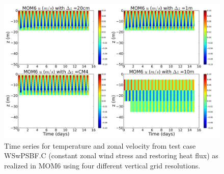\begin{figure}[h!t]
\begin{center}
\includegraphics[angle=0,width=14cm]{./figs/MOM6/WSwPSBF_C_MOM6_zonal_velocity.png}
\caption[Zonal velocity from MOM6 for WSwPSBF.C ]{\sf Time series for
  temperature and zonal velocity from test case WSwPSBF.C (constant
  zonal wind stress and restoring heat flux) as realized in MOM6 using
  four different vertical grid resolutions.}
\label{fig:WSwPSBF_C_MOM6_zonal}
\end{center}
\end{figure}



